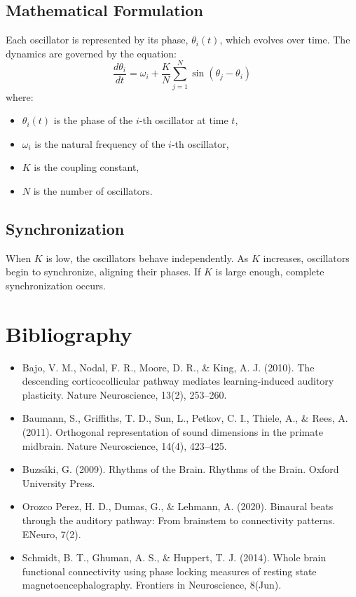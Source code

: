 \documentclass{article}
\begin{document}
\subsection{Mathematical Formulation}
Each oscillator is represented by its phase, \(\theta_i(t)\), which evolves over time. The dynamics are governed by the equation:
\[
\frac{d\theta_i}{dt} = \omega_i + \frac{K}{N} \sum_{j=1}^{N} \sin(\theta_j - \theta_i)
\]
where:
\begin{itemize}
    \item \(\theta_i(t)\) is the phase of the \(i\)-th oscillator at time \(t\),
    \item \(\omega_i\) is the natural frequency of the \(i\)-th oscillator,
    \item \(K\) is the coupling constant,
    \item \(N\) is the number of oscillators.
\end{itemize}

\subsection{Synchronization}
When \(K\) is low, the oscillators behave independently. As \(K\) increases, oscillators begin to synchronize, aligning their phases. If \(K\) is large enough, complete synchronization occurs.

\section{Bibliography}
\begin{itemize}
    \item Bajo, V. M., Nodal, F. R., Moore, D. R., \& King, A. J. (2010). The descending corticocollicular pathway mediates learning-induced auditory plasticity. Nature Neuroscience, 13(2), 253–260.
    \item Baumann, S., Griffiths, T. D., Sun, L., Petkov, C. I., Thiele, A., \& Rees, A. (2011). Orthogonal representation of sound dimensions in the primate midbrain. Nature Neuroscience, 14(4), 423–425.
    \item Buzsáki, G. (2009). Rhythms of the Brain. Rhythms of the Brain. Oxford University Press.
    \item Orozco Perez, H. D., Dumas, G., \& Lehmann, A. (2020). Binaural beats through the auditory pathway: From brainstem to connectivity patterns. ENeuro, 7(2).
    \item Schmidt, B. T., Ghuman, A. S., \& Huppert, T. J. (2014). Whole brain functional connectivity using phase locking measures of resting state magnetoencephalography. Frontiers in Neuroscience, 8(Jun).
\end{itemize}
\end{document}
